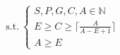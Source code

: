 \documentclass[preview]{standalone}
\begin{document}
\begin{align*}
\text{s.t.}~\begin{cases} S, P, G, C, A \in \mathbb{N} \\ E \geq C \geq \lceil \frac{A}{A - E + 1} \rceil \\ A \geq E \end{cases}
\end{align*}
\end{document}
